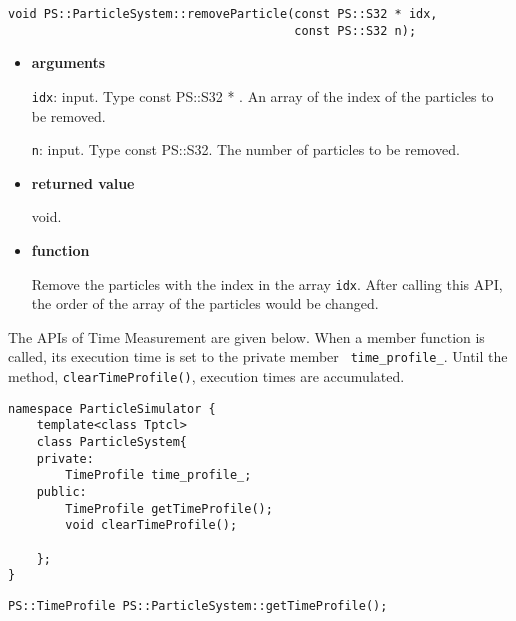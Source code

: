 \begin{screen}
\begin{verbatim}
void PS::ParticleSystem::removeParticle(const PS::S32 * idx, 
                                        const PS::S32 n);
\end{verbatim}
\end{screen}

\begin{itemize}

\item {\bf arguments}

{\tt idx}: input. Type const PS::S32 * . An array of the index of the
particles to be removed.

{\tt n}: input. Type const PS::S32. The number of particles to be removed.

\item {\bf returned value}

void.

\item {\bf function}

Remove the particles with the index in the array {\tt idx}. After
calling this API, the order of the array of the particles would be
changed.

\end{itemize}



The APIs of Time Measurement are given below. When a member function
is called, its execution time is set to the private member {\tt
time\_profile\_}. Until the method, {\tt clearTimeProfile()},
execution times are accumulated.

\begin{lstlisting}[caption=ParticleSystem3]
namespace ParticleSimulator {
    template<class Tptcl>
    class ParticleSystem{
    private:
        TimeProfile time_profile_;
    public:
        TimeProfile getTimeProfile();
        void clearTimeProfile();

    };
}
\end{lstlisting}

\begin{screen}
\begin{verbatim}
PS::TimeProfile PS::ParticleSystem::getTimeProfile();
\end{verbatim}
\end{screen}

